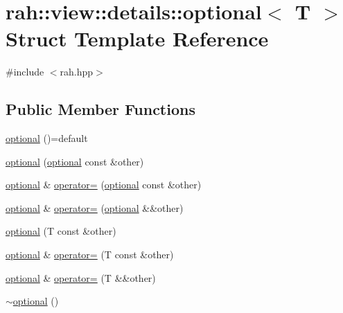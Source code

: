 \hypertarget{structrah_1_1view_1_1details_1_1optional}{}\section{rah\+::view\+::details\+::optional$<$ T $>$ Struct Template Reference}
\label{structrah_1_1view_1_1details_1_1optional}


{\ttfamily \#include $<$rah.\+hpp$>$}

\subsection*{Public Member Functions}
\begin{DoxyCompactItemize}
\item 
\mbox{\hyperlink{structrah_1_1view_1_1details_1_1optional_a70b8727b22b0d88c9cc823f818286c71}{optional}} ()=default
\item 
\mbox{\hyperlink{structrah_1_1view_1_1details_1_1optional_a8c15e1445849715fdef5bf9bfdf43a91}{optional}} (\mbox{\hyperlink{structrah_1_1view_1_1details_1_1optional}{optional}} const \&other)
\item 
\mbox{\hyperlink{structrah_1_1view_1_1details_1_1optional}{optional}} \& \mbox{\hyperlink{structrah_1_1view_1_1details_1_1optional_a0caa7da5df6580090a3ea0ea25887dfa}{operator=}} (\mbox{\hyperlink{structrah_1_1view_1_1details_1_1optional}{optional}} const \&other)
\item 
\mbox{\hyperlink{structrah_1_1view_1_1details_1_1optional}{optional}} \& \mbox{\hyperlink{structrah_1_1view_1_1details_1_1optional_abb6dd0692c4b2aa874b2a7db387e7c19}{operator=}} (\mbox{\hyperlink{structrah_1_1view_1_1details_1_1optional}{optional}} \&\&other)
\item 
\mbox{\hyperlink{structrah_1_1view_1_1details_1_1optional_a67103a826656faabd3a8d12fea4a6b33}{optional}} (T const \&other)
\item 
\mbox{\hyperlink{structrah_1_1view_1_1details_1_1optional}{optional}} \& \mbox{\hyperlink{structrah_1_1view_1_1details_1_1optional_a7e352c56530dfa8c330ac41dae64a270}{operator=}} (T const \&other)
\item 
\mbox{\hyperlink{structrah_1_1view_1_1details_1_1optional}{optional}} \& \mbox{\hyperlink{structrah_1_1view_1_1details_1_1optional_a0da71ff4ae436808c2de170250a988bb}{operator=}} (T \&\&other)
\item 
\mbox{\hyperlink{structrah_1_1view_1_1details_1_1optional_ad6f6daea081b390c0348f2907aabcc0b}{$\sim$optional}} ()

\end{DoxyCompactItemize}
